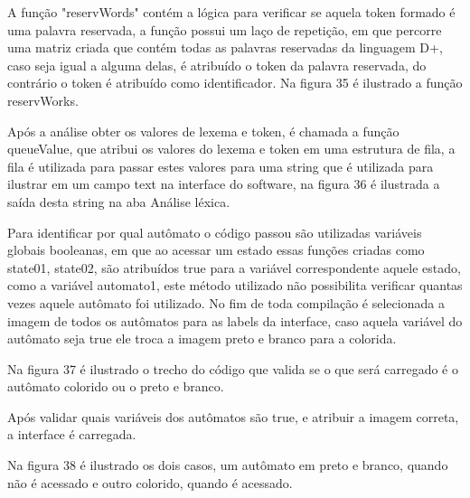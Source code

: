 \documentclass[12pt,oneside,a4paper,chapter=TITLE,section=TITLE,sumario=tradicional]{abntex2}
\begin{document}
A função "reservWords" contém a lógica para verificar se aquela token formado é uma palavra reservada, a função possui um laço de repetição, em que percorre uma matriz criada que contém todas as palavras reservadas da linguagem D+, caso seja igual a alguma delas, é atribuído o token da palavra reservada, do contrário o token é atribuído como identificador. Na figura 35 é ilustrado a função reservWorks.

\begin{figure}[htb]
\end{figure} 

Após a análise obter os valores de lexema e token, é chamada a função queueValue, que atribui os valores do lexema e token em uma estrutura de fila, a fila é utilizada para passar estes valores para uma string que é utilizada para ilustrar em um campo text na interface do software, na figura 36 é ilustrada a saída desta string na aba Análise léxica.

\begin{figure}[htb]
\end{figure} 

Para identificar por qual autômato o código passou são utilizadas variáveis globais booleanas, em que ao acessar um estado essas funções criadas como state01, state02, são atribuídos true para a variável correspondente aquele estado, como a variável automato1, este método utilizado não possibilita verificar quantas vezes aquele autômato foi utilizado. No fim de toda compilação é selecionada a imagem de todos os autômatos para as labels da interface, caso aquela variável do autômato seja true ele troca a imagem preto e branco para a colorida.  

Na figura 37 é ilustrado o trecho do código que valida se o que será carregado é o autômato colorido ou o preto e branco. 

\begin{figure}[htb]
\end{figure} 

Após validar quais variáveis dos autômatos são true, e atribuir a imagem correta, a interface é carregada. 

Na figura 38 é ilustrado os dois casos, um autômato em preto e branco, quando não é acessado e outro colorido, quando é acessado. 
\end{document}
